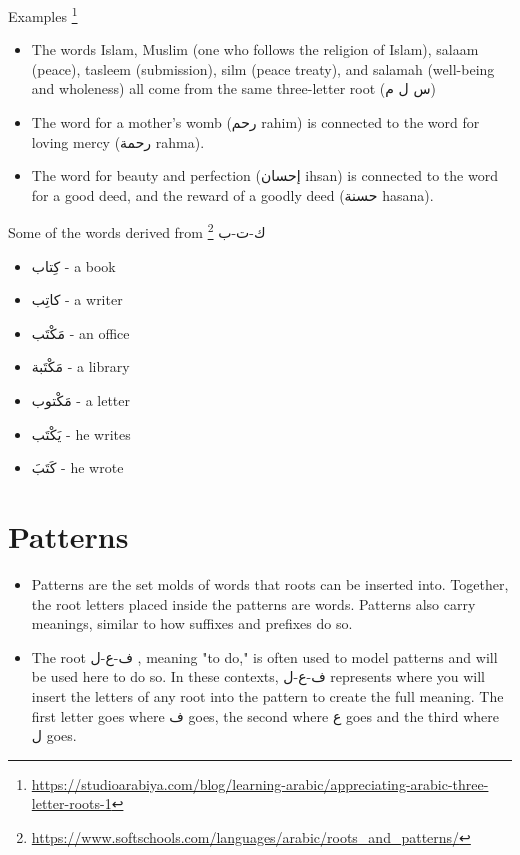 Examples
\footnote{\url{https://studioarabiya.com/blog/learning-arabic/appreciating-arabic-three-letter-roots-1}}
\begin{itemize}	    \setlength{\itemsep}{5pt}
	\item The words \textarabic{Islam}, \textarabic{Muslim} (one who follows the religion of Islam), salaam (peace), \textarabic{tasleem} (submission), \textarabic{silm} (peace treaty), and \textarabic{salamah} (well-being and wholeness) all come from the same three-letter root (\textarabic{س ل م})
	
	\item The word for a mother’s womb (\textarabic{رحم} rahim) is connected to the word for loving mercy (\textarabic{رحمة} rahma).
	
	\item  The word for beauty and perfection (\textarabic{إحسان} ihsan) is connected to the word for a good deed, and the reward of a goodly deed (\textarabic{حسنة} hasana).
	
\end{itemize}

Some of the words derived from \textarabic{ك-ت-ب}
\footnote{\url{https://www.softschools.com/languages/arabic/roots_and_patterns/}}
\begin{itemize}	    \setlength{\itemsep}{5pt}
	\item \textarabic{كِتاب} - a book
	\item \textarabic{كاتِب} - a writer
	\item \textarabic{مَكْتَب} - an office
	\item \textarabic{مَكْتَبة} - a library
	\item \textarabic{مَكْتوب} - a letter
	\item \textarabic{يَكْتَب} - he writes
	\item \textarabic{كَتَبَ} - he wrote
\end{itemize}
\section{Patterns}

\begin{itemize}	    \setlength{\itemsep}{5pt}
	\item Patterns are the set molds of words that roots can be inserted into. Together, the root letters placed inside the patterns are words. Patterns also carry meanings, similar to how suffixes and prefixes do so.
	\item The root \textarabic{ف-ع-ل} , meaning "to do," is often used to model patterns and will be used here to do so. In these contexts, \textarabic{ف-ع-ل} represents where you will insert the letters of any root into the pattern to create the full meaning. The first letter goes where \textarabic{ف} goes, the second where \textarabic{ع} goes and the third where \textarabic{ل} goes.
	
\end{itemize}




